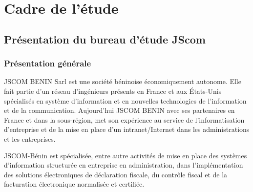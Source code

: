 \documentclass[a4paper,12pt,french]{report} %
\begin{document}

\chapter{Cadre de l'étude}

\section{Présentation du bureau d'étude JScom}
	\subsection{Présentation générale}
	JSCOM BENIN Sarl est une société béninoise économiquement autonome. Elle fait partie d'un réseau d'ingénieurs présents en France et aux États-Unis spécialisés en système d'information et en nouvelles technologies de l'information et de la communication. Aujourd'hui JSCOM BENIN avec ses partenaires en France et dans la sous-région, met son expérience au service de l'informatisation d'entreprise et de la mise en place d'un intranet/Internet dans les administrations et les entreprises.

	JSCOM-Bénin est spécialisée, entre autre activités de mise en place des systèmes d'information structurée en entreprise en administration, dans l'implémentation des solutions électroniques de déclaration fiscale, du contrôle fiscal et de la facturation électronique normalisée et certifiée.
		
\end{document}
